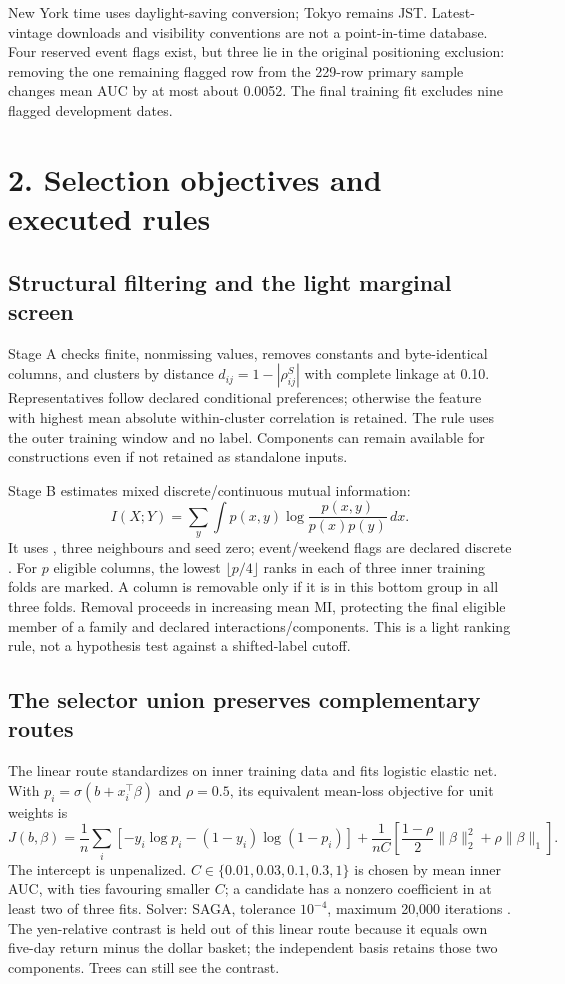 \documentclass[11pt,a4paper]{article}
\begin{document}
New York time uses daylight-saving conversion; Tokyo remains JST. Latest-vintage downloads and visibility conventions are not a point-in-time database. Four reserved event flags exist, but three lie in the original positioning exclusion: removing the one remaining flagged row from the 229-row primary sample changes mean AUC by at most about 0.0052. The final training fit excludes nine flagged development dates.

\section*{2. Selection objectives and executed rules}
\subsection*{Structural filtering and the light marginal screen}
Stage A checks finite, nonmissing values, removes constants and byte-identical columns, and clusters by distance $d_{ij}=1-|\rho^{S}_{ij}|$ with complete linkage at 0.10. Representatives follow declared conditional preferences; otherwise the feature with highest mean absolute within-cluster correlation is retained. The rule uses the outer training window and no label. Components can remain available for constructions even if not retained as standalone inputs.

Stage B estimates mixed discrete/continuous mutual information:
\[
I(X;Y)=\sum_y\int p(x,y)\log\frac{p(x,y)}{p(x)p(y)}\,dx.
\]
It uses , three neighbours and seed zero; event/weekend flags are declared discrete \cite{sklearn191_mi,ross2014mi}. For $p$ eligible columns, the lowest $\lfloor p/4\rfloor$ ranks in each of three inner training folds are marked. A column is removable only if it is in this bottom group in all three folds. Removal proceeds in increasing mean MI, protecting the final eligible member of a family and declared interactions/components. This is a light ranking rule, not a hypothesis test against a shifted-label cutoff.

\subsection*{The selector union preserves complementary routes}
The linear route standardizes on inner training data and fits logistic elastic net. With $p_i=\sigma(b+x_i^\top\beta)$ and $\rho=0.5$, its equivalent mean-loss objective for unit weights is
\[
J(b,\beta)=\frac1n\sum_i[-y_i\log p_i-(1-y_i)\log(1-p_i)]
+\frac1{nC}\left[\frac{1-\rho}{2}\|\beta\|_2^2+\rho\|\beta\|_1\right].
\]
The intercept is unpenalized. $C\in\{0.01,0.03,0.1,0.3,1\}$ is chosen by mean inner AUC, with ties favouring smaller $C$; a candidate has a nonzero coefficient in at least two of three fits. Solver: SAGA, tolerance $10^{-4}$, maximum 20,000 iterations \cite{sklearn191_logistic}. The yen-relative contrast is held out of this linear route because it equals own five-day return minus the dollar basket; the independent basis retains those two components. Trees can still see the contrast.
\end{document}
